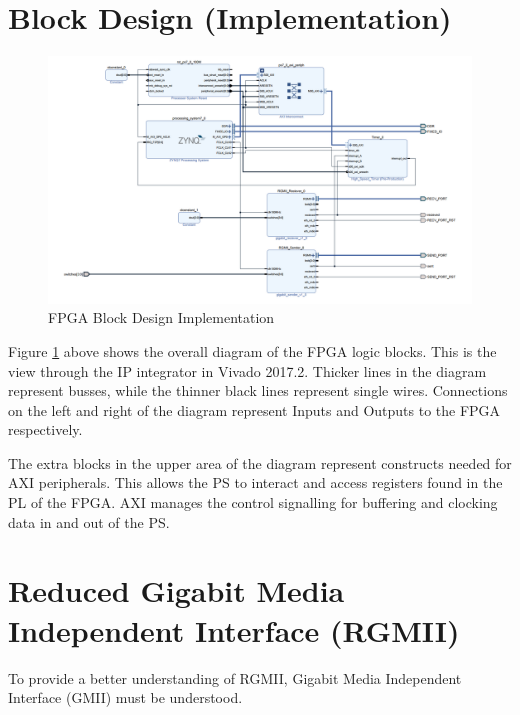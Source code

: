\section{Block Design (Implementation)}

\begin{figure}[H]
    \begin{center}
        \includegraphics[keepaspectratio,width=15cm]{Images/BlockDesignImpl}
        \caption{FPGA Block Design Implementation}
        \label{fig:blockdesignimpl}
    \end{center}
\end{figure}

\par Figure \ref{fig:blockdesignimpl} above shows the overall diagram of the FPGA logic blocks. This is the view 
through the IP integrator in Vivado 2017.2. Thicker lines in the diagram represent busses, while the thinner black 
lines represent single wires.  Connections on the left and right of the diagram represent Inputs and Outputs to the 
FPGA respectively. 

\par The extra blocks in the upper area of the diagram represent constructs needed for AXI peripherals. This allows 
the PS to interact and access registers found in the PL of the FPGA. AXI manages the control signalling for buffering 
and clocking data in and out of the PS.

\section{Reduced Gigabit Media Independent Interface (RGMII)}

\par To provide a better understanding of RGMII, Gigabit Media Independent Interface (GMII) must be understood. 

